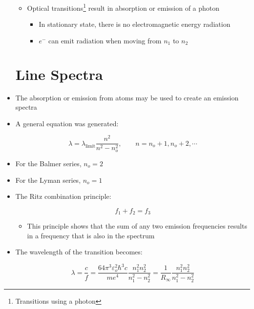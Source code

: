\begin{itemize}
\begin{itemize}
\begin{itemize}
        \end{itemize}

      \item Optical transitions\footnote{Transitions using a photon}  result in absorption or emission of a photon

        \begin{itemize}

          \item In stationary state, there is no electromagnetic energy radiation

          \item $e^-$ can emit radiation when moving from $n_1$ to $n_2$

        \end{itemize}

    \end{itemize}

    \section{Line Spectra}

  \item The absorption or emission from atoms may be used to create an emission spectra

  \item A general equation was generated:

    $$\boxed{\lambda=\lambda_{\text{limit}}\dfrac{n^2}{n^2-n_o^2},\quad\quad n=n_o+1,n_o+2,\cdots}$$

  \item For the Balmer series, $n_o=2$

  \item For the Lyman series, $n_o=1$
    
  \item The Ritz combination principle:

    $$f_1+f_2=f_3$$

    \begin{itemize}

      \item This principle shows that the sum of any two emission frequencies results in a frequency that is also in the spectrum

    \end{itemize}

  \item The wavelength of the transition becomes:

    $$\lambda=\frac{c}{f}=\dfrac{64\pi^3\varepsilon_o^2\hbar^3c}{me^4}\dfrac{n_1^2n_2^2}{n_1^2-n_2^2}=\dfrac{1}{R_{\infty}}\dfrac{n_1^2n_2^2}{n_1^2-n_2^2}$$


\end{itemize}
